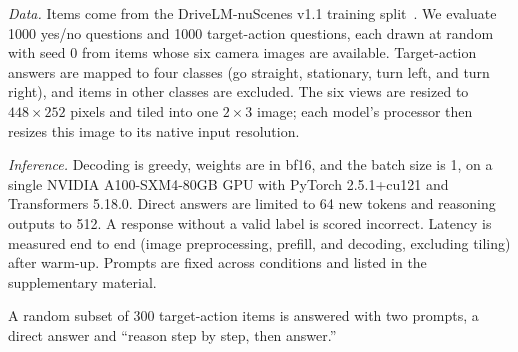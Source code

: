 \textit{Data.} Items come from the DriveLM-nuScenes v1.1 training split~\cite{sima2024drivelm}. We evaluate 1000 yes/no questions and 1000 target-action questions, each drawn at random with seed 0 from items whose six camera images are available. Target-action answers are mapped to four classes (go straight, stationary, turn left, and turn right), and items in other classes are excluded. The six views are resized to $448\times252$ pixels and tiled into one $2\times3$ image; each model's processor then resizes this image to its native input resolution.

\textit{Inference.} Decoding is greedy, weights are in bf16, and the batch size is 1, on a single NVIDIA A100-SXM4-80GB GPU with PyTorch 2.5.1+cu121 and Transformers 5.18.0. Direct answers are limited to 64 new tokens and reasoning outputs to 512. A response without a valid label is scored incorrect. Latency is measured end to end (image preprocessing, prefill, and decoding, excluding tiling) after warm-up. Prompts are fixed across conditions and listed in the supplementary material.

A random subset of 300 target-action items is answered with two prompts, a direct answer and ``reason step by step, then answer.''


